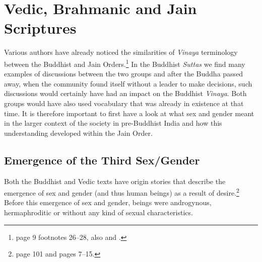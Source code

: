 \section{Vedic, Brahmanic and Jain Scriptures}

Various authors have already noticed the similarities of \textit{Vinaya} terminology between the Buddhist and Jain Orders.\footnote{\cite{maes2016} page 9 footnotes 26–28, also \cite{sujato2009} and \cite{zwilling}.} In the Buddhist \textit{Suttas} we find many examples of discussions between the two groups and after the Buddha passed away, when the community found itself without a leader to make decisions, such discussions would certainly have had an impact on the Buddhist \textit{Vinaya}. Both groups would have also used vocabulary that was already in existence at that time. It is therefore important to first have a look at what sex and gender meant in the larger context of the society in pre-Buddhist India and how this understanding developed within the Jain Order.

\subsection{Emergence of the Third Sex/Gender}
Both the Buddhist and Vedic texts have origin stories that describe the emergence of sex and gender (and thus human beings) as a result of desire.\footnote{\cite{zwilling2000} page 101 and \cite{artinger} pages 7–15.} Before this emergence of sex and gender, beings were androgynous, hermaphroditic or without any kind of sexual characteristics.

